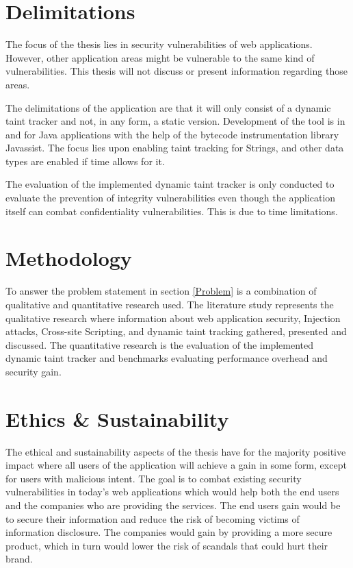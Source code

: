 \section{Delimitations}
\label{Delimitations}
The focus of the thesis lies in security vulnerabilities of web applications. However, other application areas might be vulnerable to the same kind of vulnerabilities. This thesis will not discuss or present information regarding those areas.

The delimitations of the application are that it will only consist of a dynamic taint tracker and not, in any form, a static version. Development of the tool is in and for Java applications with the help of the bytecode instrumentation library Javassist. The focus lies upon enabling taint tracking for Strings, and other data types are enabled if time allows for it.

The evaluation of the implemented dynamic taint tracker is only conducted to evaluate the prevention of integrity vulnerabilities even though the application itself can combat confidentiality vulnerabilities. This is due to time limitations.



\section{Methodology}
\label{Methodology}
To answer the problem statement in section \ref{Problem} is a combination of qualitative and quantitative research used. The literature study represents the qualitative research where information about web application security, Injection attacks, Cross-site Scripting, and dynamic taint tracking gathered, presented and discussed. The quantitative research is the evaluation of the implemented dynamic taint tracker and benchmarks evaluating performance overhead and security gain.



\section{Ethics \& Sustainability}
\label{Structure}
The ethical and sustainability aspects of the thesis have for the majority positive impact where all users of the application will achieve a gain in some form, except for users with malicious intent. The goal is to combat existing security vulnerabilities in today's web applications which would help both the end users and the companies who are providing the services. The end users gain would be to secure their information and reduce the risk of becoming victims of information disclosure. The companies would gain by providing a more secure product, which in turn would lower the risk of scandals that could hurt their brand. 

